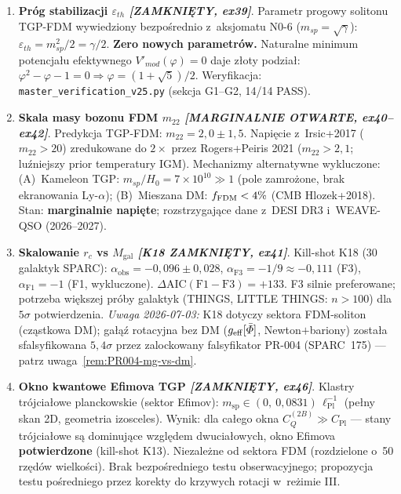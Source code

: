 \begin{enumerate}[label=\textbf{O\arabic*}., start=21, nosep]
  \item \textbf{Próg stabilizacji $\varepsilon_{th}$
        \emph{[ZAMKNI\k{E}TY, ex39]}}.
        Parametr progowy solitonu TGP-FDM wywiedziony
        bezpo\'srednio z~aksjomatu N0-6 ($m_{sp}=\sqrt{\gamma}$):
        $\varepsilon_{th} = m_{sp}^2/2 = \gamma/2$.
        \textbf{Zero nowych parametr\'ow.}
        Naturalne minimum potencja\l{}u efektywnego
        $V'_{mod}(\varphi) = 0$ daje z\l{}oty podzia\l{}:
        $\varphi^2 - \varphi - 1 = 0 \Rightarrow \varphi = (1+\sqrt{5})/2$.
        Weryfikacja: \texttt{master\_verification\_v25.py}
        (sekcja G1--G2, 14/14 PASS).

  \item \textbf{Skala masy bozonu FDM $m_{22}$
        \emph{[MARGINALNIE OTWARTE, ex40--ex42]}}.
        Predykcja TGP-FDM: $m_{22} = 2{,}0 \pm 1{,}5$.
        Napi\k{e}cie z~Irsic+2017 ($m_{22} > 20$) zredukowane do $2\times$
        przez Rogers+Peiris 2021 ($m_{22} > 2{,}1$;
        lu\'zniejszy prior temperatury IGM).
        Mechanizmy alternatywne wykluczone:
        (A)~Kameleon TGP: $m_{sp}/H_0 = 7\times10^{10} \gg 1$
        (pole zamro\.zone, brak ekranowania Ly-$\alpha$);
        (B)~Mieszana DM: $f_{\rm FDM} < 4\%$ (CMB Hlozek+2018).
        Stan: \textbf{marginalnie napięte}; rozstrzygaj\k{a}ce
        dane z~DESI DR3 i~WEAVE-QSO (2026--2027).

  \item \textbf{Skalowanie $r_c$ vs $M_{\mathrm{gal}}$ \emph{[K18 ZAMKNI\k{E}TY, ex41]}}.
        Kill-shot K18 (30 galaktyk SPARC):
        $\alpha_{\mathrm{obs}} = -0{,}096 \pm 0{,}028$,
        $\alpha_{\mathrm{F3}} = -1/9 \approx -0{,}111$ (F3),
        $\alpha_{\mathrm{F1}} = -1$ (F1, wykluczone).
        $\Delta\mathrm{AIC}(\mathrm{F1-F3}) = +133$.
        F3 silnie preferowane; potrzeba wi\k{e}kszej pr\'oby galaktyk
        (THINGS, LITTLE THINGS: $n > 100$) dla $5\sigma$ potwierdzenia.
        \emph{Uwaga 2026-07-03:} K18 dotyczy sektora FDM-soliton
        (cz\k{a}stkowa DM); ga\l{}\k{a}\'z rotacyjna bez DM
        ($g_{\rm eff}[\bar\Phi]$, Newton$+$bariony) zosta\l{}a
        sfalsyfikowana $5{,}4\sigma$ przez zalockowany falsyfikator
        PR-004 (SPARC~175) --- patrz uwaga~\ref{rem:PR004-mg-vs-dm}.

  \item \textbf{Okno kwantowe Efimova TGP \emph{[ZAMKNI\k{E}TY, ex46]}}.
        Klastry tr\'ojcia\l{}owe planckowskie (sektor Efimov):
        $m_{\mathrm{sp}} \in (0,\ 0{,}0831)\,\ell_{\mathrm{Pl}}^{-1}$
        (pe\l{}ny skan 2D, geometria izosceles).
        Wynik: dla ca\l{}ego okna $C_Q^{(2B)} \gg C_{\mathrm{Pl}}$
        --- stany trójcia\l{}owe s\k{a} dominuj\k{a}ce wzgl\k{e}dem
        dwucia\l{}owych, okno Efimova \textbf{potwierdzone} (kill-shot K13).
        Niezale\.zne od sektora FDM (rozdzielone o~50 rz\k{e}d\'ow wielkości).
        Brak bezpo\'sredniego testu obserwacyjnego; propozycja testu
        po\'sredniego przez korekty do krzywych rotacji w~re\.zimie III.
\end{enumerate}


